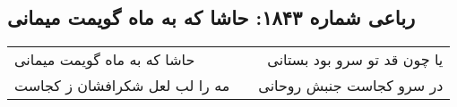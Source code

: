 \begin{center}
\section*{رباعی شماره ۱۸۴۳: حاشا که به ماه گویمت میمانی}
\label{sec:1843}
\begin{longtable}{l p{0.5cm} r}
حاشا که به ماه گویمت میمانی
&&
یا چون قد تو سرو بود بستانی
\\
مه را لب لعل شکرافشان ز کجاست
&&
در سرو کجاست جنبش روحانی
\\
\end{longtable}
\end{center}
